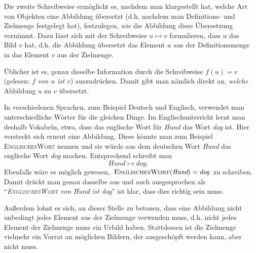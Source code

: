 \documentclass[../../main.tex]{subfiles}
\begin{document}
Die zweite Schreibweise ermöglicht es, nachdem man klargestellt hat, welche Art von Objekten eine Abbildung übersetzt (d.h. nachdem man Definitions- und Zielmenge festgelegt hat), festzulegen, \emph{wie} die Abbildung diese Übersetzung vornimmt. Dazu lässt sich mit der Schreibweise $u\mapsto v$ formulieren, dass $u$ das Bild $v$ hat, d.h. die Abbildung übersetzt das Element $u$ aus der Definitionsmenge in das Element $v$ aus der Zielmenge.

Üblicher ist es, genau dieselbe Information durch die Schreibweise $f(u)=v$ (gelesen: \emph{$f$ von $u$ ist $v$}) auszudrücken. Damit gibt man nämlich direkt an, \emph{welche} Abbildung $u$ zu $v$ übersetzt.

\begin{example}{}
    In verschiedenen Sprachen, zum Beispiel Deutsch und Englisch, verwendet man unterschiedliche Wörter für die gleichen Dinge. Im Englischunterricht lernt man deshalb Vokabeln, etwa, dass das englische Wort für \emph{Hund} das Wort \emph{dog} ist. Hier versteckt sich erneut eine Abbildung. Diese könnte man zum Beispiel \textsc{EnglischesWort} nennen und sie würde aus dem deutschen Wort \emph{Hund} das englische Wort \emph{dog} machen. Entsprechend schreibt man
    \[\textit{Hund}\mapsto\textit{dog}.\]
    Ebenfalls wäre es möglich gewesen, $\textsc{EnglischesWort}(\textit{Hund})=\textit{dog}$ zu schreiben. Damit drückt man genau dasselbe aus und auch ausgesprochen als \enquote{\emph{\textsc{EnglischesWort} von Hund ist dog}} ist klar, dass dies richtig sein muss.
\end{example}

Außerdem lohnt es sich, an dieser Stelle zu betonen, dass eine Abbildung nicht unbedingt jedes Element aus der Zielmenge verwenden muss, d.h. nicht jedes Element der Zielmenge muss ein Urbild haben. Stattdessen ist die Zielmenge vielmehr ein Vorrat an möglichen Bildern, der ausgeschöpft werden kann, aber nicht muss.
\end{document}
